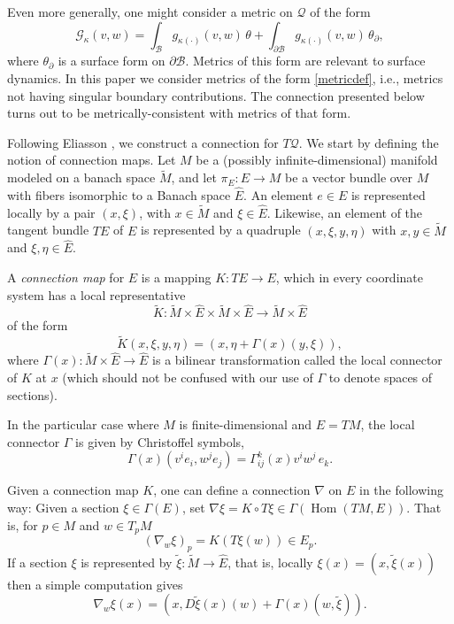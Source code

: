 \documentclass[smallextended]{svjour3}
\begin{document}
Even more generally, one might consider a metric on ${\mathcal{Q}}$ of the form 
\[
{\mathcal{G}}_\kappa(v,w) = \int_{\mathcal{B}} g_{\kappa(\cdot)}(v,w)\,\theta+\int_{\partial{\mathcal{B}}} g_{\kappa(\cdot)}(v,w)\,\theta_\partial,
\]
where $\theta_\partial$ is a surface form on $\partial{\mathcal{B}}$.
Metrics of this form are relevant to surface dynamics. 
In this paper we consider metrics of the form \eqref{metricdef}, i.e., metrics not having singular boundary contributions. The connection presented below turns out to be metrically-consistent with metrics of that form.

Following Eliasson \cite{Eli67}, we construct a connection for $T{\mathcal{Q}}$.
We start by defining the notion of connection maps. Let $M$ be a (possibly infinite-dimensional) manifold modeled on a banach space $\widetilde{M}$, and let $\pi_E:E\to M$ be a vector bundle over $M$ with fibers isomorphic to a Banach space $\hat{E}$. An element $e\in E$ is represented locally by a pair $(x,\xi)$, with $x\in \widetilde{M}$ and $\xi\in\hat{E}$. Likewise, an element of the tangent bundle $TE$ of $E$  is represented by a quadruple $(x,\xi,y,\eta)$ with $x,y\in\widetilde{M}$ and $\xi,\eta\in\hat{E}$. 

\begin{definition}
A \emph{connection map} for $E$ is a mapping $K:TE\to E$, which in every coordinate system has a local representative 
\[
\tilde{K}:\widetilde{M}\times \hat{E}\times\widetilde{M}\times\hat{E}\to \widetilde{M}\times\hat{E}
\]
of the  form
\[
\tilde{K}(x,\xi,y,\eta)=(x,\eta+\Gamma(x)(y,\xi)),
\]
 where $\Gamma(x):\tilde{M}\times \hat{E}\to \hat{E}$ is a bilinear transformation called the local connector of $K$ at $x$ (which should not be confused with our use of  $\Gamma$ to denote spaces of sections). 
\end{definition}

In the particular case where $M$ is finite-dimensional and $E=TM$, the local connector $\Gamma$ is given by  Christoffel symbols, 
\[
\Gamma(x)(v^ie_i,w^je_j)=\Gamma^k_{ij}(x)v^iw^j \, e_k.
\] 

Given a connection map $K$, one can define a connection $\nabla$ on $E$ in the following way:
Given a section $\xi\in\Gamma(E)$, set $\nabla\xi=K\circ T\xi\in\Gamma({\operatorname{Hom}}(TM,E))$. That is, for $p\in M$ and $w\in T_pM$ 
\[
(\nabla_w\xi)_p=K(T\xi(w))\in E_p.
\]
If a section $\xi$ is represented by $\tilde{\xi}:\tilde{M}\to \hat{E}$, that is, locally $\xi(x)=(x,\tilde{\xi}(x))$ then a simple computation gives
\[
\nabla_w\xi(x)=(x,D\tilde{\xi}(x)(w)+\Gamma(x)(w,\tilde{\xi})).
\]
\end{document}
